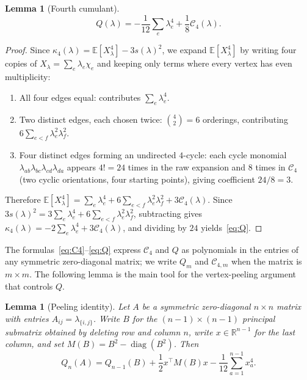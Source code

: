 \documentclass[11pt]{article}
\newtheorem{lemma}[theorem]{Lemma}
\theoremstyle{definition}
\newcommand{\R}{\mathbb{R}}
\newcommand{\E}{\mathbb{E}}
\newcommand{\diag}{\operatorname{diag}}
\begin{document}
\begin{lemma}[Fourth cumulant]\label{lem:ordered-cycle}
\begin{equation}\label{eq:Q}
  Q(\lambda)
  =
  -\frac1{12}\sum_e\lambda_e^4+\frac18\mathcal{C}_4(\lambda).
\end{equation}
\end{lemma}

\begin{proof}
Since \(\kappa_4(\lambda)=\E[X_\lambda^4]-3s(\lambda)^2\), we expand \(\E[X_\lambda^4]\) by writing four copies of \(X_\lambda=\sum_e\lambda_e\chi_e\) and keeping only terms where every vertex has even multiplicity:
\begin{enumerate}[label=(\roman*),nosep]
\item All four edges equal: contributes \(\sum_e\lambda_e^4\).
\item Two distinct edges, each chosen twice: \(\binom42=6\) orderings, contributing \(6\sum_{e<f}\lambda_e^2\lambda_f^2\).
\item Four distinct edges forming an undirected \(4\)-cycle: each cycle monomial \(\lambda_{ab}\lambda_{bc}\lambda_{cd}\lambda_{da}\) appears \(4!=24\) times in the raw expansion and \(8\) times in \(\mathcal{C}_4\) (two cyclic orientations, four starting points), giving coefficient \(24/8=3\).
\end{enumerate}
Therefore
\(\E[X_\lambda^4]
  =\sum_e\lambda_e^4
    +6\sum_{e<f}\lambda_e^2\lambda_f^2
    +3\mathcal{C}_4(\lambda)\).
Since \(3s(\lambda)^2=3\sum_e\lambda_e^4+6\sum_{e<f}\lambda_e^2\lambda_f^2\), subtracting gives \(\kappa_4(\lambda)=-2\sum_e\lambda_e^4+3\mathcal{C}_4(\lambda)\), and dividing by \(24\) yields~\eqref{eq:Q}.
\end{proof}

The formulas~\eqref{eq:C4}--\eqref{eq:Q} express \(\mathcal{C}_4\) and \(Q\) as polynomials in the entries of any symmetric zero-diagonal matrix; we write \(Q_m\) and \(\mathcal{C}_{4,m}\) when the matrix is \(m\times m\). The following lemma is the main tool for the vertex-peeling argument that controls \(Q\).

\begin{lemma}[Peeling identity]\label{lem:peeling}
Let \(A\) be a symmetric zero-diagonal \(n\times n\) matrix with entries \(A_{ij}=\lambda_{\{i,j\}}\). Write \(B\) for the \((n{-}1)\times(n{-}1)\) principal submatrix obtained by deleting row and column \(n\), write \(x\in\R^{n-1}\) for the last column, and set \(M(B)=B^2-\diag(B^2)\). Then
\[
  Q_n(A)
  =
  Q_{n-1}(B)
  +\frac12 x^\top M(B)x
  -\frac1{12}\sum_{a=1}^{n-1}x_a^4.
\]
\end{lemma}
\end{document}
